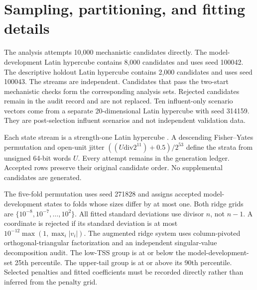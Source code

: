 \documentclass[a4paper,fleqn]{cas-sc}
\begin{document}
\section{Sampling, partitioning, and fitting details}

The analysis attempts 10,000 mechanistic candidates directly. The model-development Latin hypercube contains 8,000 candidates and uses seed 100042. The descriptive holdout Latin hypercube contains 2,000 candidates and uses seed 100043. The streams are independent. Candidates that pass the two-start mechanistic checks form the corresponding analysis sets. Rejected candidates remain in the audit record and are not replaced. Ten influent-only scenario vectors come from a separate 20-dimensional Latin hypercube with seed 314159. They are post-selection influent scenarios and not independent validation data.

Each state stream is a strength-one Latin hypercube \citep{McKay1979}. A descending Fisher--Yates permutation and open-unit jitter $((U\mathbin{\mathrm{div}}2^{11})+0.5)/2^{53}$ define the strata from unsigned 64-bit words $U$. Every attempt remains in the generation ledger. Accepted rows preserve their original candidate order. No supplemental candidates are generated.

The five-fold permutation uses seed 271828 and assigns accepted model-development states to folds whose sizes differ by at most one. Both ridge grids are $\{10^{-8},10^{-7},\ldots,10^{2}\}$. All fitted standard deviations use divisor $n$, not $n-1$. A coordinate is rejected if its standard deviation is at most $10^{-12}\max(1,\max_i|v_i|)$. The augmented ridge system uses column-pivoted orthogonal-triangular factorization and an independent singular-value decomposition audit. The low-TSS group is at or below the model-development-set 25th percentile. The upper-tail group is at or above its 90th percentile. Selected penalties and fitted coefficients must be recorded directly rather than inferred from the penalty grid.
\end{document}
